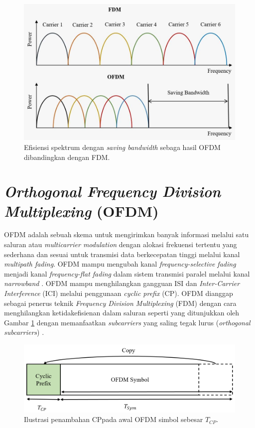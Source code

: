 \begin{figure}[tb]
	\centering
	\includegraphics[width=1\textwidth]
	{pics/ofdm}
	\caption{Efisiensi spektrum dengan \textit{saving bandwidth} sebaga hasil OFDM dibandingkan dengan FDM.}
	\label{fig:OFDM}
\end{figure}
\section{\textit{Orthogonal Frequency Division Multiplexing} (OFDM) }
OFDM adalah sebuah skema untuk mengirimkan banyak informasi melalui satu saluran atau \textit{multicarrier modulation} dengan alokasi frekuensi tertentu yang sederhana dan sesuai untuk transmisi data berkecepatan tinggi melalui kanal \textit{multipath fading}. OFDM mampu mengubah kanal \textit{frequency-selective fading} menjadi kanal \textit{frequency-flat fading} dalam sistem transmisi paralel melalui kanal \textit{narrowband} \cite{ofdm}. OFDM mampu menghilangkan gangguan ISI dan \textit{Inter-Carrier Interference} (ICI) melalui penggunaan \textit{cyclic prefix} (CP). OFDM dianggap sebagai penerus teknik \textit{Frequency Division Multiplexing} (FDM) dengan cara menghilangkan ketidakefisienan dalam saluran seperti yang ditunjukkan oleh Gambar \ref{fig:OFDM} dengan memanfaatkan \textit{subcarriers} yang saling tegak lurus (\textit{orthogonal subcarriers}) \cite{ofdm2}.

\begin{figure}[tb]
	\centering
	\includegraphics[width=1\textwidth]
	{pics/cyclicprefix}
	\caption{Ilustrasi penambahan CPpada awal OFDM simbol sebesar $T_{CP}$.}
	\label{fig:CP}
\end{figure}


